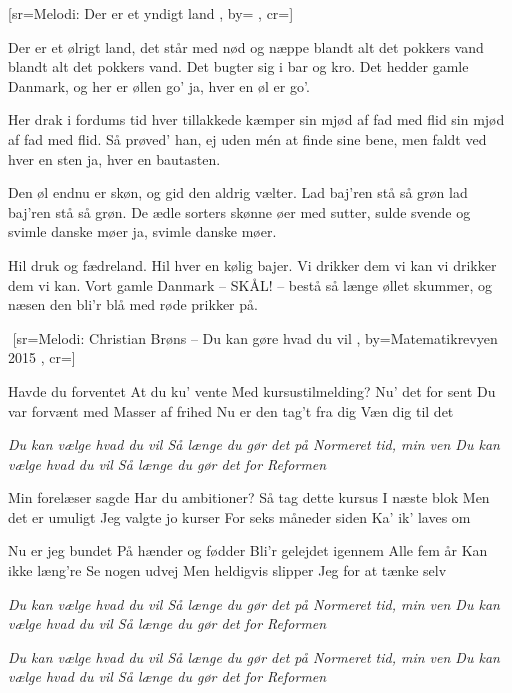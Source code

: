 \documentclass[pdftex,12pt]{article}
\begin{document}
\begin{songs}{}
[sr={Melodi: Der er et yndigt land}
,
by={}
,
cr={}]\hypertarget{Der er et ølrigt land}{}
\label{song75}

\beginverse
Der er et ølrigt land,
det står med nød og næppe
blandt alt det pokkers vand
blandt alt det pokkers vand.
Det bugter sig i bar og kro.
Det hedder gamle Danmark,
og her er øllen go'
ja, hver en øl er go'.

\endverse
\beginverse
Her drak i fordums tid
hver tillakkede kæmper
sin mjød af fad med flid
sin mjød af fad med flid.
Så prøved' han, ej uden mén
at finde sine bene,
men faldt ved hver en sten
ja, hver en bautasten.

\endverse
\beginverse
Den øl endnu er skøn,
og gid den aldrig vælter.
Lad baj'ren stå så grøn
lad baj'ren stå så grøn.
De ædle sorters skønne øer
med sutter, sulde svende
og svimle danske møer
ja, svimle danske møer.

\endverse
\beginverse
Hil druk og fædreland.
Hil hver en kølig bajer.
Vi drikker dem vi kan
vi drikker dem vi kan.
Vort gamle Danmark -- SKÅL! -- bestå
så længe øllet skummer,
og næsen den bli'r blå
med røde prikker på.

\endverse
\endsong



﻿
[sr={Melodi: Christian Brøns -- Du kan gøre hvad du vil}
,
by={Matematikrevyen 2015}
,
cr={}]\hypertarget{Kursustilmelding}{}
\label{song76}

\beginverse
Havde du forventet
At du ku' vente
Med kursustilmelding?
Nu' det for sent
Du var forvænt med
Masser af frihed
Nu er den tag't fra dig
Væn dig til det
\endverse

\beginverse
\emph{Du kan vælge hvad du vil
Så længe du gør det på
Normeret tid, min ven
Du kan vælge hvad du vil
Så længe du gør det for
Reformen}
\endverse

\beginverse
Min forelæser sagde
Har du ambitioner?
Så tag dette kursus
I næste blok
Men det er umuligt
Jeg valgte jo kurser
For seks måneder siden
Ka' ik' laves om
\endverse

\beginverse
Nu er jeg bundet
På hænder og fødder
Bli'r gelejdet igennem
Alle fem år
Kan ikke læng're
Se nogen udvej
Men heldigvis slipper
Jeg for at tænke selv
\endverse

\beginverse
\emph{Du kan vælge hvad du vil
Så længe du gør det på
Normeret tid, min ven
Du kan vælge hvad du vil
Så længe du gør det for
Reformen}
\endverse

\beginverse
\emph{\lrep Du kan vælge hvad du vil
Så længe du gør det på
Normeret tid, min ven\rrep
Du kan vælge hvad du vil
Så længe du gør det for
Reformen}
\endverse


\end{songs}
\end{document}
